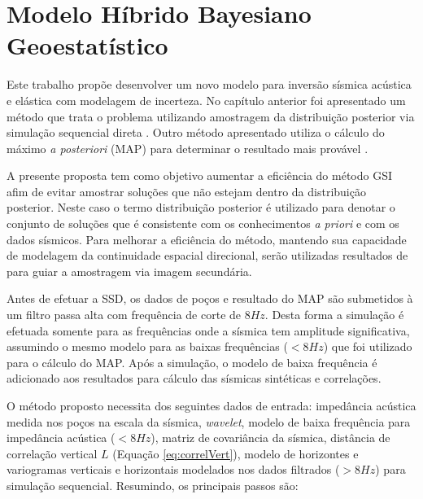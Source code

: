\chapter{Modelo Híbrido Bayesiano Geoestatístico}
\label{cap:3modeloHibrido}


Este trabalho propõe desenvolver um novo modelo para inversão sísmica acústica e
elástica com modelagem de incerteza. No capítulo anterior foi apresentado um
método que trata o problema utilizando amostragem da distribuição posterior via
simulação sequencial direta \citep{amilcarInversao}. Outro método apresentado
utiliza o cálculo do máximo \textit{a posteriori} (MAP) para determinar o
resultado mais provável \citep{Buland01012003}.

A presente proposta tem como objetivo aumentar a eficiência do método GSI
\citep{amilcarInversao} afim de evitar amostrar soluções que não estejam dentro
da distribuição posterior. Neste caso o termo distribuição posterior é utilizado
para denotar o conjunto de soluções que é consistente com os conhecimentos
\textit{a priori} e com os dados sísmicos. Para melhorar a eficiência do método,
mantendo sua capacidade de modelagem da continuidade espacial direcional, serão
utilizadas resultados de \cite{Buland01012003} para guiar a amostragem via
imagem secundária.

Antes de efetuar a SSD, os dados de poços e resultado do MAP são submetidos à um
filtro passa alta com frequência de corte de $8Hz$. Desta forma a simulação é
efetuada somente para as frequências onde a sísmica tem amplitude significativa,
assumindo o mesmo modelo para as baixas frequências ($<8Hz$) que foi utilizado
para o cálculo do MAP. Após a simulação, o modelo de baixa frequência é
adicionado aos resultados para cálculo das sísmicas sintéticas e correlações.

O método proposto necessita dos seguintes dados de entrada: impedância acústica
medida nos poços na escala da sísmica, \textit{wavelet}, modelo de baixa
frequência para impedância acústica ($<8Hz$), matriz de covariância da sísmica,
distância de correlação vertical $L$ (Equação \ref{eq:correlVert}), modelo de
horizontes e variogramas verticais e horizontais modelados nos dados filtrados
($>8Hz$) para simulação sequencial. Resumindo, os principais passos são:


